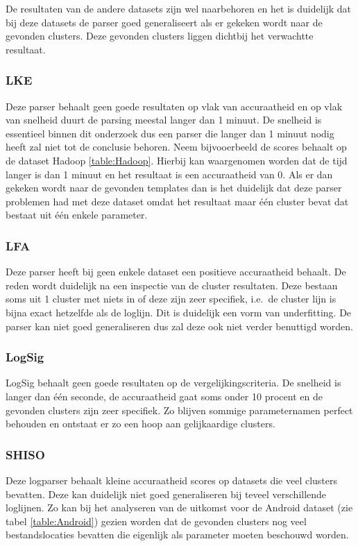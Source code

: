 De resultaten van de andere datasets zijn wel naarbehoren en het is duidelijk dat bij deze datasets de parser goed generaliseert als er gekeken wordt naar de gevonden clusters. Deze gevonden clusters liggen dichtbij het verwachtte resultaat.

\subsubsection{LKE}
Deze parser behaalt geen goede resultaten op vlak van accuraatheid en op vlak van snelheid duurt de parsing meestal langer dan 1 minuut. De snelheid is essentieel binnen dit onderzoek dus een parser die langer dan 1 minuut nodig heeft zal niet tot de conclusie behoren. Neem bijvooerbeeld de scores behaalt op de dataset Hadoop \ref{table:Hadoop}. Hierbij kan waargenomen worden dat de tijd langer is dan 1 minuut en het resultaat is een accuraatheid van 0. Als er dan gekeken wordt naar de gevonden templates dan is het duidelijk dat deze parser problemen had met deze dataset omdat het resultaat maar één cluster bevat dat bestaat uit één enkele parameter.

\subsubsection{LFA} 
Deze parser heeft bij geen enkele dataset een positieve accuraatheid behaalt. De reden wordt duidelijk na een inspectie van de cluster resultaten. Deze bestaan soms uit 1 cluster met niets in of deze zijn zeer specifiek, i.e.\ de cluster lijn is bijna exact hetzelfde als de loglijn. Dit is duidelijk een vorm van underfitting. De parser kan niet goed generaliseren dus zal deze ook niet verder benuttigd worden.

\subsubsection{LogSig}
LogSig behaalt geen goede resultaten op de vergelijkingscriteria. De snelheid is langer dan één seconde, de accuraatheid gaat soms onder 10 procent en de gevonden clusters zijn zeer specifiek. Zo blijven sommige parameternamen perfect behouden en ontstaat er zo een hoop aan gelijkaardige clusters.

\subsubsection{SHISO}
Deze logparser behaalt kleine accuraatheid scores op datasets die veel clusters bevatten. Deze kan duidelijk niet goed generaliseren bij teveel verschillende loglijnen. Zo kan bij het analyseren van de uitkomst voor de Android dataset (zie tabel \ref{table:Android}) gezien worden dat de gevonden clusters nog veel bestandslocaties bevatten die eigenlijk als parameter moeten beschouwd worden.

